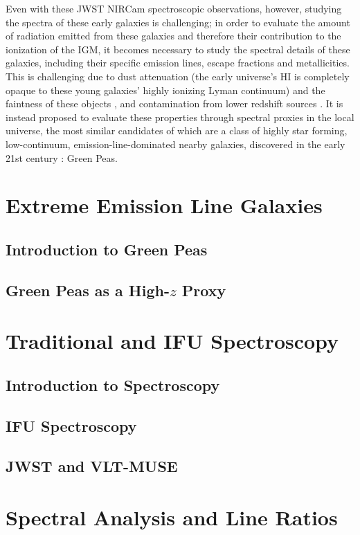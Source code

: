 \documentclass[fleqn,usenatbib]{mnras}
\begin{document}
Even with these JWST NIRCam spectroscopic observations, however, studying the spectra of these early galaxies is challenging; in order to evaluate the amount of radiation emitted from these galaxies and therefore their contribution to the ionization of the IGM, it becomes necessary to study the spectral details of these galaxies, including their specific emission lines, escape fractions and metallicities. This is challenging due to dust attenuation \citep{Inoue_2014} (the early universe's HI is completely opaque to these young galaxies' highly ionizing Lyman continuum) and the faintness of these objects \citep{vanzella_2010}, and contamination from lower redshift sources \citep{Grazian_2015}. It is instead proposed to evaluate these properties through spectral proxies in the local universe, the most similar candidates of which are a class of highly star forming, low-continuum, emission-line-dominated nearby galaxies, discovered in the early 21st century \citep{Cardamone}: Green Peas.


\section{Extreme Emission Line Galaxies}
\label{sec:eelg}
\subsection{Introduction to Green Peas}
\subsection{Green Peas as a High-$z$ Proxy}

\section{Traditional and IFU Spectroscopy}
\label{sec:spectro}
\subsection{Introduction to Spectroscopy}
\subsection{IFU Spectroscopy}
\subsection{JWST and VLT-MUSE}

\section{Spectral Analysis and Line Ratios}
\label{sec:method}
\end{document}
